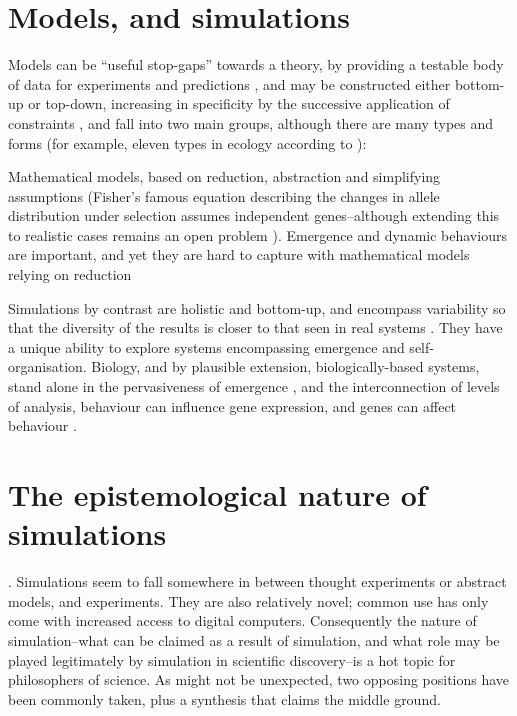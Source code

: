 \section{Models, and simulations}\label{models}

Models can be ``useful stop-gaps'' towards a theory, by providing a testable body of data for experiments and predictions \parencite{Krakauer2011}, and may be constructed either bottom-up or top-down, increasing in specificity by the successive application of constraints \parencite{Krakauer2011}, and fall into two main groups, although there are many types and forms (for example, eleven types in ecology according to \parencite{Jorgensen2008}):

Mathematical models, based on reduction, abstraction and simplifying assumptions (\eg Fisher's famous equation describing the changes in allele distribution under selection assumes independent genes--although extending this to realistic cases remains an open problem \parencite{Schuster2011}). Emergence and dynamic behaviours are important, and yet they are hard to capture with mathematical models relying on reduction \parencite{Ferrer:2008hv}

Simulations by contrast are holistic and bottom-up, and encompass variability so that the diversity of the results is closer to that seen in real systems \parencite{Ferrer:2008hv}. They have a unique ability to explore systems encompassing emergence and self-organisation. Biology, and by plausible extension, biologically-based systems, stand alone in the pervasiveness of emergence \parencite{Bersini:2006ve}, and the interconnection of levels of analysis, \eg behaviour can influence gene expression, and genes can affect behaviour \parencite{Krakauer2011}.

\section{The epistemological nature of simulations}\label{the-epistemological-nature-of-simulations}. Simulations seem to fall somewhere in between thought experiments or abstract models, and experiments. They are also relatively novel; common use has only come with increased access to digital computers. Consequently the nature of simulation--what can be claimed as a result of simulation, and what role may be played legitimately by simulation in scientific discovery--is a hot topic for philosophers of science. As might not be unexpected, two opposing positions have been commonly taken, plus a synthesis that claims the middle ground.

